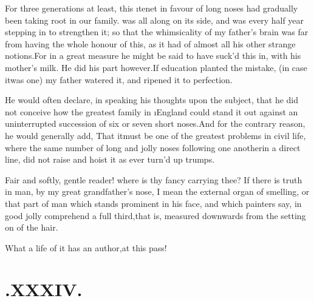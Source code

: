 \documentclass[twoside]{article}
\begin{document}
For three generations at least, this \i{te\-net} in favour of
long noses had gradually been taking root in our family.\tsh
{} was all along on its side, and
 was every half year stepping in to strengthen
it; so that the whimsicality of my father’s brain was far
from
having the whole honour of this, as it had of almost all his
other strange notions.\tsk For in a great measure he might be
said to have suck’d this in, with his mother’s milk. He did his
part however.\tsh If\break
education planted the mistake, (in case it\break was one) my father
watered it, and ri\-pened it to perfection.

He would often declare, in speaking his thoughts upon the
subject, that he did not conceive how the greatest family in
\i{England} could stand it out against an uninterrupted
succession of six or seven short noses.\tsk And for the contrary
reason, he would generally add, That it\break must be one of
the greatest problems in civil life, where the same number of long
and jolly noses following one another\break in a direct line, did not
raise and hoist it
as ever turn’d up trumps.

\tsh Fair and softly, gentle reader!\break
\tsh where is thy fancy carrying thee?\break
\tsh If there is truth in man, by my
great grandfather’s nose, I mean the external organ of smelling,
or that part of man which stands prominent in his
face,
\tsk and which painters say, in good jolly\break
{}\break
comprehend a full third,\tsh that is, measured
downwards from the setting on of the hair.\tsh

\tsh What a life of it has an author,\break at this pass!

\section{.\quad  XXXIV.}
\end{document}
